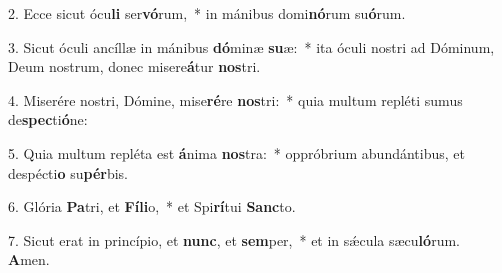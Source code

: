 2. Ecce sicut ócu\textbf{li} ser\textbf{vó}rum,~*  in mánibus domi\textbf{nó}rum su\textbf{ó}rum.\

3. Sicut óculi ancíllæ in mánibus \textbf{dó}minæ \textbf{su}æ:~*  ita óculi nostri ad Dóminum, Deum nostrum, donec misere\textbf{á}tur \textbf{nos}tri.\

4. Miserére nostri, Dómine, mise\textbf{ré}re \textbf{nos}tri:~*  quia multum repléti sumus de\textbf{spec}ti\textbf{ó}ne:\

5. Quia multum repléta est \textbf{á}nima \textbf{nos}tra:~*  oppróbrium abundántibus, et despécti\textbf{o} su\textbf{pér}bis.\

6. Glória \textbf{Pa}tri, et \textbf{Fí}\textbf{li}o,~*  et Spi\textbf{rí}tui \textbf{Sanc}to.\

7. Sicut erat in princípio, et \textbf{nunc}, et \textbf{sem}per,~*  et in sǽcula sæcu\textbf{ló}rum. \textbf{A}men.\

